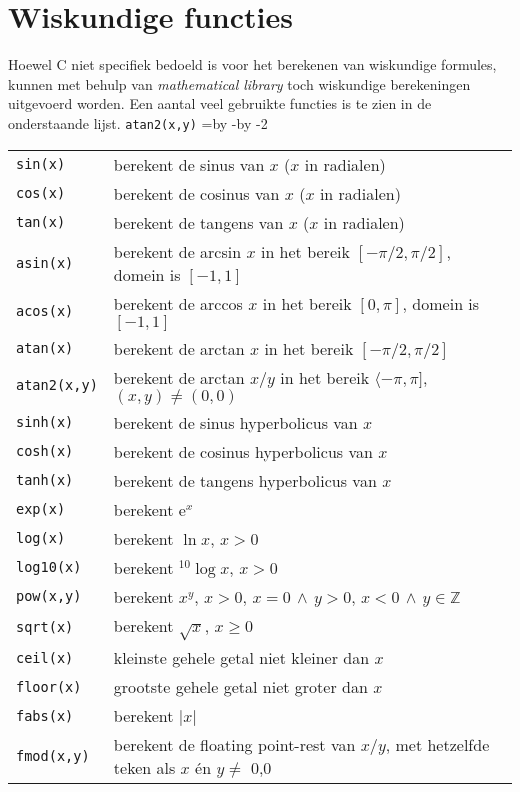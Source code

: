 \section{Wiskundige functies}
Hoewel C niet specifiek bedoeld is voor het berekenen van wiskundige formules, kunnen met behulp van \textsl{mathematical library} toch wiskundige berekeningen uitgevoerd worden. Een aantal veel gebruikte functies is te zien in de onderstaande lijst.
\hbox{\texttt{atan2(x,y)}}
\newdimen\delengteb\delengteb=\textwidth\advance\delengteb by -\advance\delengteb by -2\tabcolsep
\begin{table}[!ht]
\centering
\begin{tabular}{lp{\delengteb}@{}}
\texttt{sin(x)} & berekent de sinus van $x$ ($x$ in radialen)\\
\texttt{cos(x)} & berekent de cosinus van $x$ ($x$ in radialen)\\
\texttt{tan(x)} & berekent de tangens van $x$ ($x$ in radialen)\\
\texttt{asin(x)} & berekent de arcsin $x$ in het bereik $[-\pi/2, \pi/2]$, domein is $[-1,1]$\\
\texttt{acos(x)} & berekent de arccos $x$ in het bereik $[0, \pi]$, domein is $[-1,1]$\\
\texttt{atan(x)} & berekent de arctan $x$ in het bereik $[-\pi/2, \pi/2]$\\
\texttt{atan2(x,y)} & berekent de arctan $x/y$ in het bereik $\langle-\pi, \pi]$, $(x,y)\neq(0,0)$\\
\texttt{sinh(x)} & berekent de sinus hyperbolicus van $x$\\
\texttt{cosh(x)} & berekent de cosinus hyperbolicus van $x$\\
\texttt{tanh(x)} & berekent de tangens hyperbolicus van $x$\\
\texttt{exp(x)} & berekent $\mathrm{e}^x$\\
\texttt{log(x)} & berekent $\ln x$, $x>0$\\
\texttt{log10(x)} & berekent $^{10}\!\log x$, $x>0$\\
\texttt{pow(x,y)} & berekent $x^y$, $x>0,\,x=0\,\wedge\,y>0,\,x<0\,\wedge\,y\in\mathbb{Z}$\\
\texttt{sqrt(x)} & berekent $\sqrt{x}$, $x\geq0$\\
\texttt{ceil(x)} & kleinste gehele getal niet kleiner dan $x$\\
\texttt{floor(x)} & grootste gehele getal niet groter dan $x$\\
\texttt{fabs(x)} & berekent $|x|$\\
\texttt{fmod(x,y)} & berekent de floating point-rest van $x/y$, met hetzelfde teken als $x$ én $y\neq$ 0,0\\
\end{tabular}
\end{table}

